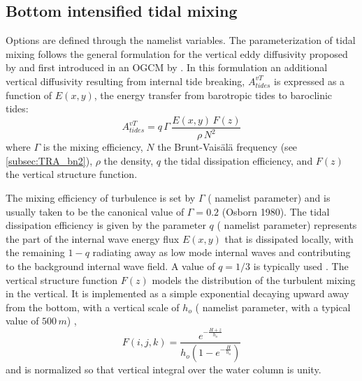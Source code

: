 \documentclass[../main/NEMO_manual]{subfiles}
\begin{document}
%


\subsection{Bottom intensified tidal mixing}
\label{subsec:ZDF_tmx_bottom}

Options are defined through the   namelist variables.
The parameterization of tidal mixing follows the general formulation for the vertical eddy diffusivity proposed by
\citet{St_Laurent_al_GRL02} and first introduced in an OGCM by \citep{Simmons_al_OM04}. 
In this formulation an additional vertical diffusivity resulting from internal tide breaking,
$A^{vT}_{tides}$ is expressed as a function of $E(x,y)$,
the energy transfer from barotropic tides to baroclinic tides:
\begin{equation}
  \label{eq:Ktides}
  A^{vT}_{tides} =  q \,\Gamma \,\frac{ E(x,y) \, F(z) }{ \rho \, N^2 }
\end{equation}
where $\Gamma$ is the mixing efficiency, $N$ the Brunt-Vais\"{a}l\"{a} frequency (see \autoref{subsec:TRA_bn2}),
$\rho$ the density, $q$ the tidal dissipation efficiency, and $F(z)$ the vertical structure function. 

The mixing efficiency of turbulence is set by $\Gamma$ ( namelist parameter) and
is usually taken to be the canonical value of $\Gamma = 0.2$ (Osborn 1980). 
The tidal dissipation efficiency is given by the parameter $q$ ( namelist parameter)
represents the part of the internal wave energy flux $E(x, y)$ that is dissipated locally,
with the remaining $1-q$ radiating away as low mode internal waves and
contributing to the background internal wave field.
A value of $q=1/3$ is typically used \citet{St_Laurent_al_GRL02}.
The vertical structure function $F(z)$ models the distribution of the turbulent mixing in the vertical.
It is implemented as a simple exponential decaying upward away from the bottom,
with a vertical scale of $h_o$ ( namelist parameter,
with a typical value of $500\,m$) \citep{St_Laurent_Nash_DSR04}, 
\[
  F(i,j,k) = \frac{ e^{ -\frac{H+z}{h_o} } }{ h_o \left( 1- e^{ -\frac{H}{h_o} } \right) }
\]
and is normalized so that vertical integral over the water column is unity. 
\end{document}
